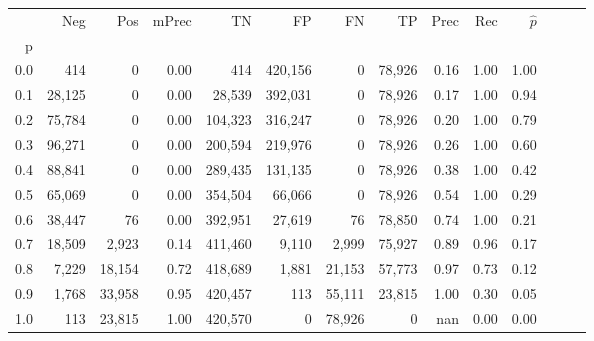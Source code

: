 \begin{tabular}{rrrrrrrrrrrrrr}
\toprule
{} &     Neg &     Pos & mPrec &       TN &       FP &      FN &      TP &  Prec &   Rec & $\hat{p}$ \\
p   &         &         &       &          &          &         &         &       &       &           \\
\midrule
0.0 &     414 &       0 &  0.00 &      414 &  420,156 &       0 &  78,926 &  0.16 &  1.00 &      1.00 \\
0.1 &  28,125 &       0 &  0.00 &   28,539 &  392,031 &       0 &  78,926 &  0.17 &  1.00 &      0.94 \\
0.2 &  75,784 &       0 &  0.00 &  104,323 &  316,247 &       0 &  78,926 &  0.20 &  1.00 &      0.79 \\
0.3 &  96,271 &       0 &  0.00 &  200,594 &  219,976 &       0 &  78,926 &  0.26 &  1.00 &      0.60 \\
0.4 &  88,841 &       0 &  0.00 &  289,435 &  131,135 &       0 &  78,926 &  0.38 &  1.00 &      0.42 \\
0.5 &  65,069 &       0 &  0.00 &  354,504 &   66,066 &       0 &  78,926 &  0.54 &  1.00 &      0.29 \\
0.6 &  38,447 &      76 &  0.00 &  392,951 &   27,619 &      76 &  78,850 &  0.74 &  1.00 &      0.21 \\
0.7 &  18,509 &   2,923 &  0.14 &  411,460 &    9,110 &   2,999 &  75,927 &  0.89 &  0.96 &      0.17 \\
0.8 &   7,229 &  18,154 &  0.72 &  418,689 &    1,881 &  21,153 &  57,773 &  0.97 &  0.73 &      0.12 \\
0.9 &   1,768 &  33,958 &  0.95 &  420,457 &      113 &  55,111 &  23,815 &  1.00 &  0.30 &      0.05 \\
1.0 &     113 &  23,815 &  1.00 &  420,570 &        0 &  78,926 &       0 &   nan &  0.00 &      0.00 \\
\bottomrule
\end{tabular}
